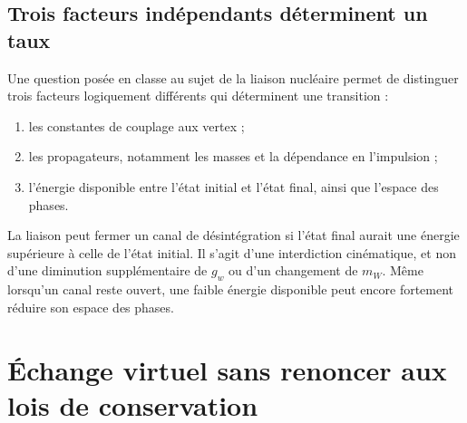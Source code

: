 \subsection{Trois facteurs indépendants déterminent un taux}

Une question posée en classe au sujet de la liaison nucléaire permet de distinguer trois facteurs logiquement différents qui déterminent une transition :
\begin{enumerate}
  \item les constantes de couplage aux vertex ;
  \item les propagateurs, notamment les masses et la dépendance en l’impulsion ;
  \item l’énergie disponible entre l’état initial et l’état final, ainsi que l’espace des phases.
\end{enumerate}
La liaison peut fermer un canal de désintégration si l’état final aurait une énergie supérieure à celle de l’état initial. Il s’agit d’une interdiction cinématique, et non d’une diminution supplémentaire de \(g_w\) ou d’un changement de \(m_W\). Même lorsqu’un canal reste ouvert, une faible énergie disponible peut encore fortement réduire son espace des phases.

\begin{classroomqa}
\end{classroomqa}

\begin{classroomqa}
\end{classroomqa}

\section{Échange virtuel sans renoncer aux lois de conservation}

